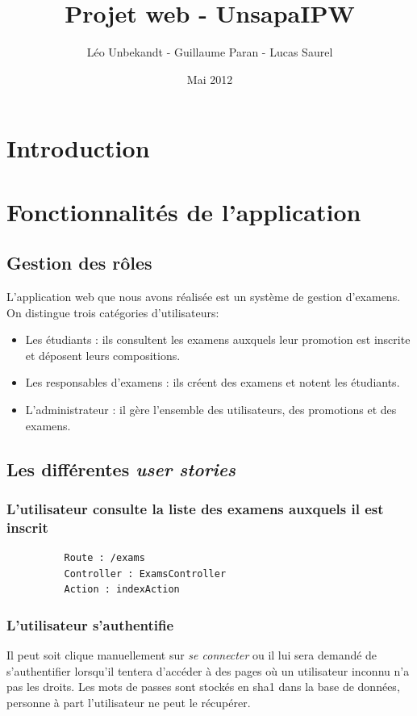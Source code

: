 \documentclass{report}
\author{Léo Unbekandt - Guillaume Paran - Lucas Saurel}
\date{Mai 2012}
\title{Projet web - UnsapaIPW}
\begin{document}
  \maketitle
  \clearpage
  \tableofcontents
  \clearpage

  \section*{Introduction}

  \section{Fonctionnalités de l'application}
    \subsection{Gestion des rôles}
      L'application web que nous avons réalisée est un système de gestion 
      d'examens. On distingue trois catégories d'utilisateurs:
      \begin{itemize}
        \item{Les étudiants : ils consultent les examens auxquels leur promotion 
          est inscrite et déposent leurs compositions.}
        \item{Les responsables d'examens : ils créent des examens et notent les 
          étudiants.}
        \item{L'administrateur : il gère l'ensemble des utilisateurs, des 
          promotions et des examens.}
      \end{itemize}

    \subsection{Les différentes \textsl{user stories}}
      \subsubsection{L'utilisateur consulte la liste des examens auxquels il est inscrit}
        \begin{verbatim}
          Route : /exams 
          Controller : ExamsController
          Action : indexAction
        \end{verbatim}
      \subsubsection{L'utilisateur s'authentifie}
        Il peut soit clique manuellement sur \textsl{se connecter} ou il lui sera demandé
        de s'authentifier lorsqu'il tentera d'accéder à des pages où un utilisateur inconnu
        n'a pas les droits. Les mots de passes sont stockés en sha1 dans la base de données,
        personne à part l'utilisateur ne peut le récupérer.
\end{document}
